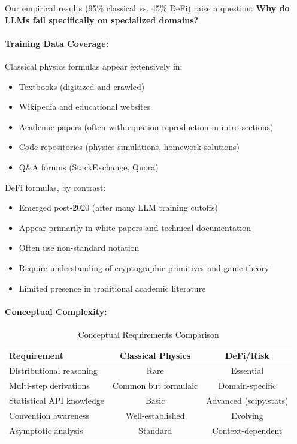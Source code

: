\documentclass[twoside,11pt]{article}
\begin{document}
Our empirical results (95\% classical vs. 45\% DeFi) raise a question: \textbf{Why do LLMs fail specifically on specialized domains?}

\paragraph{Training Data Coverage:}

Classical physics formulas appear extensively in:
\begin{itemize}
\item Textbooks (digitized and crawled)
\item Wikipedia and educational websites
\item Academic papers (often with equation reproduction in intro sections)
\item Code repositories (physics simulations, homework solutions)
\item Q\&A forums (StackExchange, Quora)
\end{itemize}

DeFi formulas, by contrast:
\begin{itemize}
\item Emerged post-2020 (after many LLM training cutoffs)
\item Appear primarily in white papers and technical documentation
\item Often use non-standard notation
\item Require understanding of cryptographic primitives and game theory
\item Limited presence in traditional academic literature
\end{itemize}

\paragraph{Conceptual Complexity:}

\begin{table}[H]
\centering
\caption{Conceptual Requirements Comparison}
\label{tab:conceptual_complexity}
\begin{tabular}{@{}lcc@{}}
\toprule
\textbf{Requirement} & \textbf{Classical Physics} & \textbf{DeFi/Risk} \\
\midrule
Distributional reasoning & Rare & Essential \\
Multi-step derivations & Common but formulaic & Domain-specific \\
Statistical API knowledge & Basic & Advanced (scipy.stats) \\
Convention awareness & Well-established & Evolving \\
Asymptotic analysis & Standard & Context-dependent \\
\bottomrule
\end{tabular}
\end{table}
\end{document}
